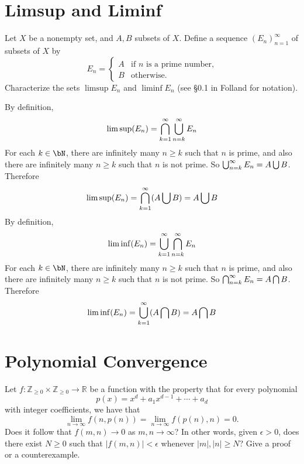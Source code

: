\documentclass[lang=cn,11pt]{elegantbook}
\begin{document}
\section{Limsup and Liminf}
Let $X$ be a nonempty set, and $A, B$ subsets of $X$. Define a sequence $(E_n)_{n=1}^\infty$ of subsets of $X$ by
\[
E_n = 
\begin{cases} 
A & \text{if } n \text{ is a prime number,} \\
B & \text{otherwise.}
\end{cases}
\]
Characterize the sets $\limsup E_n$ and $\liminf E_n$ (see §0.1 in Folland for notation).
\begin{solution}
By definition, 
    $$
    \limsup (E_n)  = \bigcap_{k = 1}^\infty \bigcup_{n=k}^\infty E_n
    $$
For each $k \in \bN$, there are infinitely many $n \geq k$ such that $n$ is prime, and also there are infinitely many $n \geq k$ such that $n$ is not prime. So $ \bigcup_{n=k}^\infty E_n = A \bigcup B$.
Therefore
$$
\limsup (E_n)  = \bigcap_{k = 1}^\infty (A\bigcup B) = A\bigcup B
$$
By definition, 
    $$
    \liminf (E_n)  = \bigcup_{k = 1}^\infty \bigcap_{n=k}^\infty E_n
    $$
For each $k \in \bN$, there are infinitely many $n \geq k$ such that $n$ is prime, and also there are infinitely many $n \geq k$ such that $n$ is not prime. So $ \bigcap_{n=k}^\infty E_n = A \bigcap B$.
Therefore
$$
\liminf (E_n)  = \bigcup_{k = 1}^\infty (A\bigcap B) = A\bigcap B
$$

\end{solution}




\section{Polynomial Convergence}
Let $f : \mathbb{Z}_{\geq 0} \times \mathbb{Z}_{\geq 0} \to \mathbb{R}$ be a function with the property that for every polynomial
\[
p(x) = x^d + a_1 x^{d-1} + \cdots + a_d
\]
with integer coefficients, we have that
\[
\lim_{n \to \infty} f(n, p(n)) = \lim_{n \to \infty} f(p(n), n) = 0.
\]
Does it follow that $f(m,n) \to 0$ as $m, n \to \infty$? In other words, given $\epsilon > 0$, does there exist $N \geq 0$ such that $\lvert f(m,n) \rvert < \epsilon$ whenever $\lvert m \rvert, \lvert n \rvert \geq N$? Give a proof or a counterexample.
\end{document}
